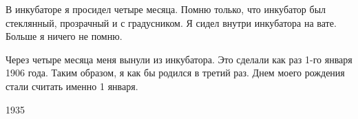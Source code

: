     В  инкубаторе я  просидел четыре  месяца. Помню только, что инкубатор  был стеклянный,  прозрачный и с градусником.  Я сидел внутри  инкубатора на вате.  Больше я ничего не помню.

     Через четыре  месяца меня вынули из инкубатора.  Это сделали  как раз  1-го января 1906 года. Таким образом, я как бы родился в третий раз.  Днем  моего рождения стали считать именно 1 января.

\begin{flushright}                                        1935\end{flushright}    
